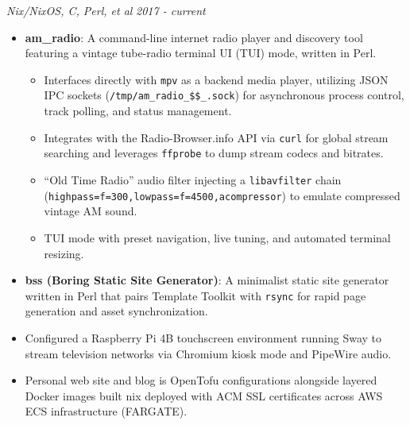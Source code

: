 \documentclass[10pt,letterpaper]{article}
\newcommand{\entry}[3]{%
  \noindent\textbf{\color{accentcolor}#1} \hfill \textit{#3} \quad \quad \textit{#2}\par
}
\begin{document}
\entry{}{2017 - current}{Nix/NixOS, C, Perl, et al}
\begin{itemize}[leftmargin=1.2em, itemsep=0.25em]
  \item \textbf{am\_radio}: A command-line internet radio player and discovery tool featuring a vintage tube-radio terminal UI (TUI) mode, written in Perl.
    \begin{itemize}[leftmargin=1.2em, itemsep=0.25em]
            \item[] Interfaces directly with \texttt{mpv} as a backend media player, utilizing JSON IPC sockets (\texttt{/tmp/am\_radio\_\$\$\_.sock}) for asynchronous process control, track polling, and status management.
            \item[] Integrates with the Radio-Browser.info API via \texttt{curl} for global stream searching and leverages \texttt{ffprobe} to dump stream codecs and bitrates.
            \item[] ``Old Time Radio'' audio filter injecting a \texttt{libavfilter} chain (\texttt{highpass=f=300,lowpass=f=4500,acompressor}) to emulate compressed vintage AM sound.
            \item[] TUI mode with preset navigation, live tuning, and automated terminal resizing.
    \end{itemize}

    \item \textbf{bss (Boring Static Site Generator)}: A minimalist static site generator written in Perl that pairs Template Toolkit with \texttt{rsync} for rapid page generation and asset synchronization.
  \item Configured a Raspberry Pi 4B touchscreen environment running Sway to stream television networks via Chromium kiosk mode and PipeWire audio.
  \item Personal web site and blog is OpenTofu configurations alongside layered Docker images built nix deployed with ACM SSL certificates across AWS ECS infrastructure (FARGATE).
\end{itemize}
\end{document}
